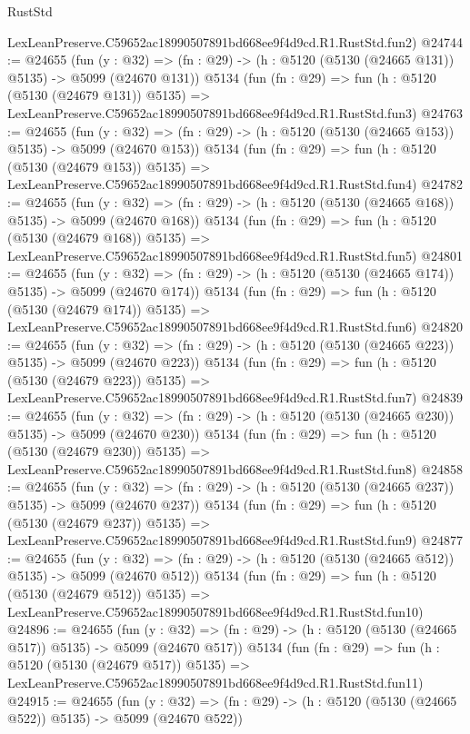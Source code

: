 \begin{lexlean}{RustStd}
\begin{coremodule}
    LexLeanPreserve.C59652ac18990507891bd668ee9f4d9cd.R1.RustStd.fun2)
@24744 := @24655
    (fun (y : @32) => (fn : @29) -> (h : @5120 (@5130 (@24665 @131)) @5135) -> @5099 (@24670 @131))
    @5134
    (fun (fn : @29) =>
    fun (h : @5120 (@5130 (@24679 @131)) @5135) =>
    LexLeanPreserve.C59652ac18990507891bd668ee9f4d9cd.R1.RustStd.fun3)
@24763 := @24655
    (fun (y : @32) => (fn : @29) -> (h : @5120 (@5130 (@24665 @153)) @5135) -> @5099 (@24670 @153))
    @5134
    (fun (fn : @29) =>
    fun (h : @5120 (@5130 (@24679 @153)) @5135) =>
    LexLeanPreserve.C59652ac18990507891bd668ee9f4d9cd.R1.RustStd.fun4)
@24782 := @24655
    (fun (y : @32) => (fn : @29) -> (h : @5120 (@5130 (@24665 @168)) @5135) -> @5099 (@24670 @168))
    @5134
    (fun (fn : @29) =>
    fun (h : @5120 (@5130 (@24679 @168)) @5135) =>
    LexLeanPreserve.C59652ac18990507891bd668ee9f4d9cd.R1.RustStd.fun5)
@24801 := @24655
    (fun (y : @32) => (fn : @29) -> (h : @5120 (@5130 (@24665 @174)) @5135) -> @5099 (@24670 @174))
    @5134
    (fun (fn : @29) =>
    fun (h : @5120 (@5130 (@24679 @174)) @5135) =>
    LexLeanPreserve.C59652ac18990507891bd668ee9f4d9cd.R1.RustStd.fun6)
@24820 := @24655
    (fun (y : @32) => (fn : @29) -> (h : @5120 (@5130 (@24665 @223)) @5135) -> @5099 (@24670 @223))
    @5134
    (fun (fn : @29) =>
    fun (h : @5120 (@5130 (@24679 @223)) @5135) =>
    LexLeanPreserve.C59652ac18990507891bd668ee9f4d9cd.R1.RustStd.fun7)
@24839 := @24655
    (fun (y : @32) => (fn : @29) -> (h : @5120 (@5130 (@24665 @230)) @5135) -> @5099 (@24670 @230))
    @5134
    (fun (fn : @29) =>
    fun (h : @5120 (@5130 (@24679 @230)) @5135) =>
    LexLeanPreserve.C59652ac18990507891bd668ee9f4d9cd.R1.RustStd.fun8)
@24858 := @24655
    (fun (y : @32) => (fn : @29) -> (h : @5120 (@5130 (@24665 @237)) @5135) -> @5099 (@24670 @237))
    @5134
    (fun (fn : @29) =>
    fun (h : @5120 (@5130 (@24679 @237)) @5135) =>
    LexLeanPreserve.C59652ac18990507891bd668ee9f4d9cd.R1.RustStd.fun9)
@24877 := @24655
    (fun (y : @32) => (fn : @29) -> (h : @5120 (@5130 (@24665 @512)) @5135) -> @5099 (@24670 @512))
    @5134
    (fun (fn : @29) =>
    fun (h : @5120 (@5130 (@24679 @512)) @5135) =>
    LexLeanPreserve.C59652ac18990507891bd668ee9f4d9cd.R1.RustStd.fun10)
@24896 := @24655
    (fun (y : @32) => (fn : @29) -> (h : @5120 (@5130 (@24665 @517)) @5135) -> @5099 (@24670 @517))
    @5134
    (fun (fn : @29) =>
    fun (h : @5120 (@5130 (@24679 @517)) @5135) =>
    LexLeanPreserve.C59652ac18990507891bd668ee9f4d9cd.R1.RustStd.fun11)
@24915 := @24655
    (fun (y : @32) => (fn : @29) -> (h : @5120 (@5130 (@24665 @522)) @5135) -> @5099 (@24670 @522))

\end{coremodule}
\end{lexlean}
